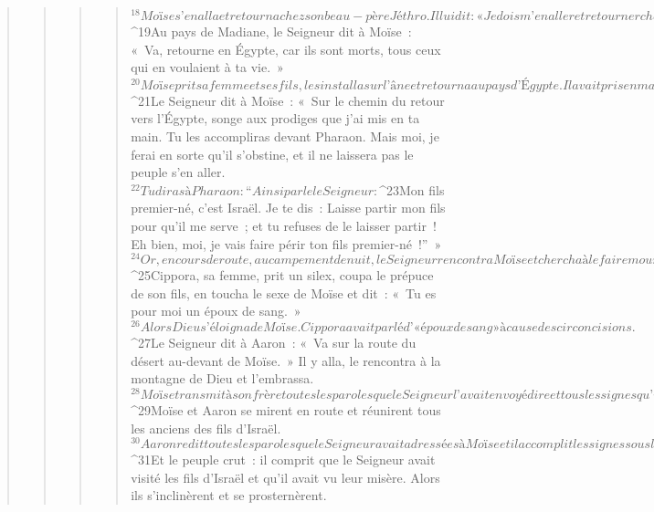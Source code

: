 \begin{verse}
\begin{verse}
\begin{verse}
\begin{verse}
${}^{18}Moïse s’en alla et retourna chez son beau-père Jéthro. Il lui dit : « Je dois m’en aller et retourner chez mes frères, en Égypte, pour voir s’ils vivent encore. » Jéthro lui dit : « Va en paix. » 
${}^{19}Au pays de Madiane, le Seigneur dit à Moïse : « Va, retourne en Égypte, car ils sont morts, tous ceux qui en voulaient à ta vie. » 
${}^{20}Moïse prit sa femme et ses fils, les installa sur l’âne et retourna au pays d’Égypte. Il avait pris en main le bâton de Dieu. 
${}^{21}Le Seigneur dit à Moïse : « Sur le chemin du retour vers l’Égypte, songe aux prodiges que j’ai mis en ta main. Tu les accompliras devant Pharaon. Mais moi, je ferai en sorte qu’il s’obstine, et il ne laissera pas le peuple s’en aller. 
${}^{22}Tu diras à Pharaon : “Ainsi parle le Seigneur : 
${}^{23}Mon fils premier-né, c’est Israël. Je te dis : Laisse partir mon fils pour qu’il me serve ; et tu refuses de le laisser partir ! Eh bien, moi, je vais faire périr ton fils premier-né !” »
${}^{24}Or, en cours de route, au campement de nuit, le Seigneur rencontra Moïse et chercha à le faire mourir. 
${}^{25}Cippora, sa femme, prit un silex, coupa le prépuce de son fils, en toucha le sexe de Moïse et dit : « Tu es pour moi un époux de sang. » 
${}^{26}Alors Dieu s’éloigna de Moïse. Cippora avait parlé d’« époux de sang » à cause des circoncisions.
${}^{27}Le Seigneur dit à Aaron : « Va sur la route du désert au-devant de Moïse. » Il y alla, le rencontra à la montagne de Dieu et l’embrassa. 
${}^{28}Moïse transmit à son frère toutes les paroles que le Seigneur l’avait envoyé dire et tous les signes qu’il avait ordonné de faire. 
${}^{29}Moïse et Aaron se mirent en route et réunirent tous les anciens des fils d’Israël. 
${}^{30}Aaron redit toutes les paroles que le Seigneur avait adressées à Moïse et il accomplit les signes sous les yeux du peuple. 
${}^{31}Et le peuple crut : il comprit que le Seigneur avait visité les fils d’Israël et qu’il avait vu leur misère. Alors ils s’inclinèrent et se prosternèrent.
      

\end{verse}
\end{verse}
\end{verse}
\end{verse}
